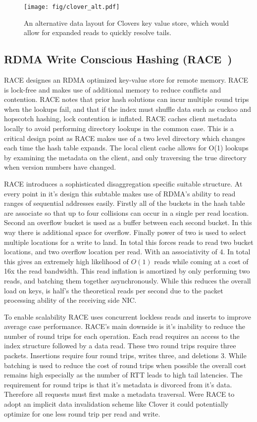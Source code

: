\begin{figure}
    \texttt{[image: fig/clover\_alt.pdf]}

    \caption{An alternative data layout for Clovers key value store, which would allow for expanded reads to quickly resolve tails.}
    \label{fig:clover_alt}
\end{figure}


\subsection{RDMA Write Conscious Hashing (RACE~\cite{one-sided-hash})}

RACE designes an RDMA optimized key-value store for remote memory. RACE is
lock-free and makes use of additional memory to reduce conflicts and contention.
RACE notes that prior hash solutions can incur multiple round trips when the
lookups fail, and that if the index must shuffle data such as cuckoo and
hopscotch hashing, lock contention is inflated. RACE caches client metadata
locally to avoid performing directory lookups in the common case. This is a
critical design point as RACE makes use of a two level directory which changes
each time the hash table expands. The local client cache allows for O(1) lookups
by examining the metadata on the client, and only traversing the true directory
when version numbers have changed.

RACE introduces a sophisticated disaggregation specific suitable structure. At
every point in it's design this subtable makes use of RDMA's ability to read
ranges of sequential addresses easily. Firstly all of the buckets in the hash
table are associate so that up to four collisions can occur in a single per read
location. Second an overflow bucket is used as a buffer between each second
bucket. In this way there is additional space for overflow. Finally power of two
is used to select multiple locations for a write to land. In total this forces
reads to read two bucket locations, and two overflow location per read. With an
associativity of 4. In total this gives an extremely high likelihood of $O(1)$
reads while coming at a cost of 16x the read bandwidth. This read inflation is
amortized by only performing two reads, and batching them together
asynchronously. While this reduces the overall load on keys, is half's the
theoretical reads per second due to the packet processing ability of the
receiving side NIC. 

To enable scalability RACE uses concurrent lockless reads and inserts to improve
average case performance.  RACE's main downside is it's inability to reduce the
number of round trips for each operation. Each read requires an access to the
index structure followed by a data read. These two round trips require three
packets. Insertions require four round trips, writes three, and deletions 3.
While batching is used to reduce the cost of round trips when possible the
overall cost remains high especially as the number of RTT leads to high tail
latencies. The requirement for round trips is that it's metadata is divorced
from it's data. Therefore all requests must first make a metadata traversal.
Were RACE to adopt an implicit data invalidation scheme like Clover it could
potentially optimize for one less round trip per read and write.

